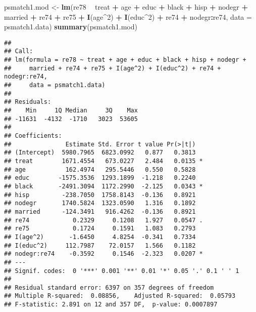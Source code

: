 \documentclass[]{article}
\newenvironment{Shaded}{\begin{snugshade}}{\end{snugshade}}
\newcommand{\DataTypeTok}[1]{\textcolor[rgb]{0.13,0.29,0.53}{#1}}
\newcommand{\DecValTok}[1]{\textcolor[rgb]{0.00,0.00,0.81}{#1}}
\newcommand{\KeywordTok}[1]{\textcolor[rgb]{0.13,0.29,0.53}{\textbf{#1}}}
\newcommand{\NormalTok}[1]{#1}
\newcommand{\OperatorTok}[1]{\textcolor[rgb]{0.81,0.36,0.00}{\textbf{#1}}}
\newcommand{\StringTok}[1]{\textcolor[rgb]{0.31,0.60,0.02}{#1}}
\begin{document}
\begin{Shaded}
\begin{Highlighting}[]
\NormalTok{psmatch1.mod <-}\StringTok{ }\KeywordTok{lm}\NormalTok{(re78 }\OperatorTok{~}\StringTok{ }\NormalTok{treat }\OperatorTok{+}\StringTok{ }\NormalTok{age }\OperatorTok{+}\StringTok{ }\NormalTok{educ }\OperatorTok{+}\StringTok{ }\NormalTok{black }\OperatorTok{+}\StringTok{ }\NormalTok{hisp }\OperatorTok{+}\StringTok{ }\NormalTok{nodegr }\OperatorTok{+}\StringTok{ }\NormalTok{married }\OperatorTok{+}\StringTok{ }\NormalTok{re74 }\OperatorTok{+}\StringTok{ }\NormalTok{re75 }\OperatorTok{+}\StringTok{ }
\StringTok{                     }\KeywordTok{I}\NormalTok{(age}\OperatorTok{^}\DecValTok{2}\NormalTok{) }\OperatorTok{+}\StringTok{ }\KeywordTok{I}\NormalTok{(educ}\OperatorTok{^}\DecValTok{2}\NormalTok{) }\OperatorTok{+}\StringTok{ }\NormalTok{re74 }\OperatorTok{+}\StringTok{ }\NormalTok{nodegr}\OperatorTok{:}\NormalTok{re74, }
                   \DataTypeTok{data =}\NormalTok{ psmatch1.data)}
\KeywordTok{summary}\NormalTok{(psmatch1.mod) }
\end{Highlighting}
\end{Shaded}

\begin{verbatim}
## 
## Call:
## lm(formula = re78 ~ treat + age + educ + black + hisp + nodegr + 
##     married + re74 + re75 + I(age^2) + I(educ^2) + re74 + nodegr:re74, 
##     data = psmatch1.data)
## 
## Residuals:
##    Min     1Q Median     3Q    Max 
## -11631  -4132  -1710   3023  53605 
## 
## Coefficients:
##               Estimate Std. Error t value Pr(>|t|)  
## (Intercept)  5980.7965  6823.0992   0.877   0.3813  
## treat        1671.4554   673.0227   2.484   0.0135 *
## age           162.4974   295.5446   0.550   0.5828  
## educ        -1575.3536  1293.1899  -1.218   0.2240  
## black       -2491.3094  1172.2990  -2.125   0.0343 *
## hisp         -238.7050  1758.8143  -0.136   0.8921  
## nodegr       1740.5824  1323.0590   1.316   0.1892  
## married      -124.3491   916.4262  -0.136   0.8921  
## re74            0.2329     0.1208   1.927   0.0547 .
## re75            0.1724     0.1591   1.083   0.2793  
## I(age^2)       -1.6450     4.8254  -0.341   0.7334  
## I(educ^2)     112.7987    72.0157   1.566   0.1182  
## nodegr:re74    -0.3592     0.1546  -2.323   0.0207 *
## ---
## Signif. codes:  0 '***' 0.001 '**' 0.01 '*' 0.05 '.' 0.1 ' ' 1
## 
## Residual standard error: 6397 on 357 degrees of freedom
## Multiple R-squared:  0.08856,    Adjusted R-squared:  0.05793 
## F-statistic: 2.891 on 12 and 357 DF,  p-value: 0.0007897
\end{verbatim}
\end{document}
